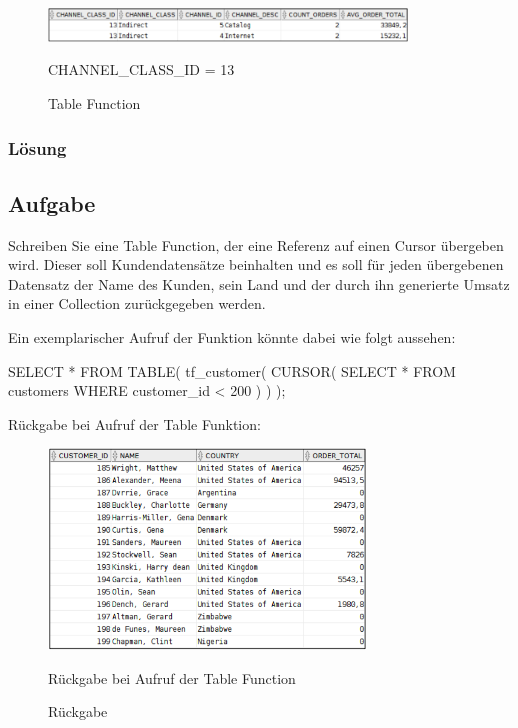 \begin{figure}[H]
  \centering
  \includegraphics[width=0.85\textwidth]{img//uebung_02_-_aufgabe_02.png}
  \label{img:uebung_02_-_aufgabe_02}
  \caption{Table Function}{CHANNEL\_CLASS\_ID = 13}
\end{figure}


\subsubsection*{Lösung}
\label{sec:uebung_02.aufgabe_02.loesung}


\subsection{Aufgabe}
\label{sec:uebung_02.aufgabe_03}
Schreiben Sie eine Table Function, der eine Referenz auf einen Cursor übergeben wird. Dieser soll Kundendatensätze beinhalten und es soll für jeden übergebenen Datensatz der Name des Kunden, sein Land und der durch ihn generierte Umsatz in einer Collection zurückgegeben werden.

Ein exemplarischer Aufruf der Funktion könnte dabei wie folgt aussehen:
\begin{sqlcode}
SELECT *
FROM TABLE(
  tf_customer(
    CURSOR(
      SELECT *
      FROM customers
      WHERE customer_id < 200
    )
  )
);
\end{sqlcode}

Rückgabe bei Aufruf der Table Funktion:
\begin{figure}[H]
  \centering
  \includegraphics[width=0.75\textwidth]{img//uebung_02_-_aufgabe_03.png}
  \label{img:uebung_02_-_aufgabe_03}
  \caption{Rückgabe}{Rückgabe bei Aufruf der Table Function}
\end{figure}

